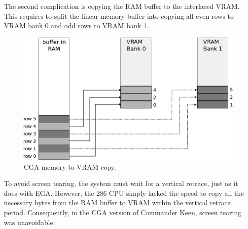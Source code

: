 \documentclass[book.tex]{subfiles}
\begin{document}
\par
\begin{minipage}{\textwidth}
  
\end{minipage}
\label{state_type}

\par
The second complication is copying the RAM buffer to the interlaced VRAM. This requires to split the linear memory buffer into copying all even rows to VRAM bank 0 and odd rows to VRAM bank 1.

\begin{figure}[H]
\centering
\includegraphics[width=1.0\textwidth]{imgs/drawings/cga_VRAM_copy.eps}
\caption{CGA memory to VRAM copy.}
\label{fig:cga_interlaced}
\end{figure}

\par
To avoid screen tearing, the system must wait for a vertical retrace, just as it does with EGA. However, the 286 CPU simply lacked the speed to copy all the necessary bytes from the RAM buffer to VRAM within the vertical retrace period. Consequently, in the CGA version of Commander Keen, screen tearing was unavoidable.\\


\par
\begin{minipage}{\textwidth}
  
\end{minipage}
\label{cga_screen_refresh}
\end{document}
